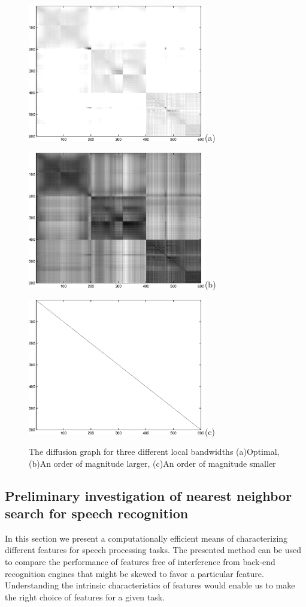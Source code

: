 \documentclass[12pt,letterpaper,doublespaced,ETD,dvips,proposal]{gtthesis}
\begin{document}
\begin{Body}
\begin{figure}[!htb]
 \centerline{\includegraphics[height=6cm]{fig4b.eps}(a)}
\centerline{\includegraphics[height=6cm]{fig4d.eps}(b)}
\centerline{\includegraphics[height=6cm]{fig4f.eps}(c)}
 \caption{The diffusion graph for three different local bandwidths
(a)Optimal, (b)An order of magnitude larger, (c)An order of
magnitude smaller}
  \label{fig5}
\end{figure}


\subsection{Preliminary investigation of nearest neighbor search for speech recognition}

In this section we present a computationally efficient means of
characterizing different features for speech processing tasks. The
presented method can be used to compare the performance of features
free of interference from back-end recognition engines that might be
skewed to favor a particular feature. Understanding the intrinsic
characteristics of features would enable us to make the right choice
of features for a given task.


\end{Body}
\end{document}
